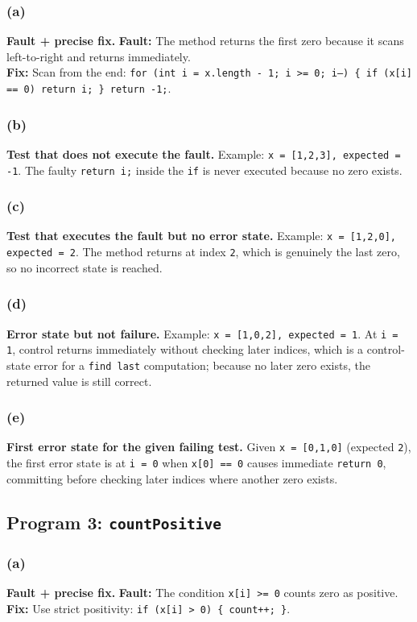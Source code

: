 \subsubsection{(a)}
\textbf{Fault + precise fix.}
\textbf{Fault:} The method returns the first zero because it scans left-to-right and returns immediately. \\
\textbf{Fix:} Scan from the end: \texttt{for (int i = x.length - 1; i >= 0; i--) \{ if (x[i] == 0) return i; \} return -1;}.

\subsubsection{(b)}
\textbf{Test that does not execute the fault.}
Example: \texttt{x = [1,2,3], expected = -1}. The faulty \texttt{return i;} inside the \texttt{if} is never executed because no zero exists.

\subsubsection{(c)}
\textbf{Test that executes the fault but no error state.}
Example: \texttt{x = [1,2,0], expected = 2}. The method returns at index \texttt{2}, which is genuinely the last zero, so no incorrect state is reached.

\subsubsection{(d)}
\textbf{Error state but not failure.}
Example: \texttt{x = [1,0,2], expected = 1}. At \texttt{i = 1}, control returns immediately without checking later indices, which is a control-state error for a \texttt{find last} computation; because no later zero exists, the returned value is still correct.

\subsubsection{(e)}
\textbf{First error state for the given failing test.}
Given \texttt{x = [0,1,0]} (expected \texttt{2}), the first error state is at \texttt{i = 0} when \texttt{x[0] == 0} causes immediate \texttt{return 0}, committing before checking later indices where another zero exists.

\subsection{Program 3: \texttt{countPositive}}
\subsubsection{(a)}
\textbf{Fault + precise fix.}
\textbf{Fault:} The condition \texttt{x[i] >= 0} counts zero as positive. \\
\textbf{Fix:} Use strict positivity: \texttt{if (x[i] > 0) \{ count++; \}}.

